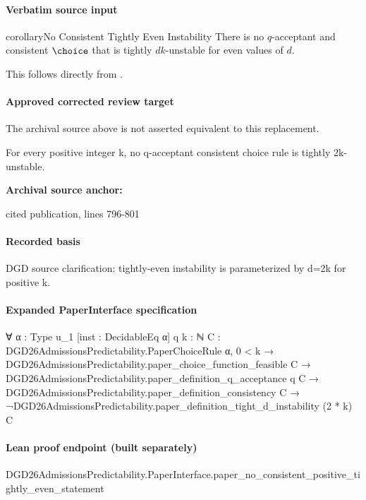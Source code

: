 \documentclass[10pt]{article}
\begin{document}
\paragraph{Verbatim source input}
\begin{ReviewVerbatim}
\begin{restatable}{corollary}{No Consistent Tightly Even Instability}
\label{cor:even-inconsistency}
There is no $q$-acceptant and consistent $\choice$ that is tightly $dk$-unstable for even values of $d$.
\end{restatable}

This follows directly from .
\end{ReviewVerbatim}

\paragraph{Approved corrected review target}
The archival source above is not asserted equivalent to this replacement.
\begin{ReviewVerbatim}
For every positive integer k, no q-acceptant consistent choice rule is tightly 2k-unstable.
\end{ReviewVerbatim}

\textbf{Archival source anchor:} {\footnotesize\raggedright cited publication, lines 796-\allowbreak{}801\par}
\paragraph{Recorded basis}
DGD source clarification:\allowbreak{} tightly-\allowbreak{}even instability is parameterized by d=2k for positive k.\allowbreak{}
\paragraph{Expanded PaperInterface specification}
\begin{ReviewVerbatim}
∀ {α : Type u_1} [inst : DecidableEq α] {q k : ℕ} {C : DGD26AdmissionsPredictability.PaperChoiceRule α},
  0 < k →
    DGD26AdmissionsPredictability.paper_choice_function_feasible C →
      DGD26AdmissionsPredictability.paper_definition_q_acceptance q C →
        DGD26AdmissionsPredictability.paper_definition_consistency C →
          ¬DGD26AdmissionsPredictability.paper_definition_tight_d_instability (2 * k) C
\end{ReviewVerbatim}

\paragraph{Lean proof endpoint (built separately)}\begin{ReviewVerbatim}
DGD26AdmissionsPredictability.PaperInterface.paper_no_consistent_positive_tightly_even_statement
\end{ReviewVerbatim}
\end{document}
